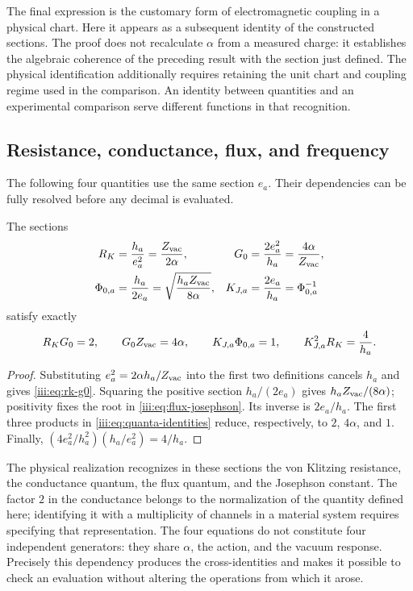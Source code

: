 The final expression is the customary form of electromagnetic coupling
in a physical chart. Here it appears as a subsequent identity of the
constructed sections. The proof does not recalculate $\alpha$ from a measured
charge: it establishes the algebraic coherence of the preceding result with the
section just defined. The physical identification additionally requires
retaining the unit chart and coupling regime used in the
comparison. An identity between quantities and an experimental comparison
serve different functions in that recognition.

\subsection{Resistance, conductance, flux, and frequency}

The following four quantities use the same section $e_a$. Their
dependencies can be fully resolved before any decimal is evaluated.

\begin{theorem}
The sections
\begin{align}
 R_K&=\frac{h_a}{e_a^2}=\frac{Z_{\rm vac}}{2\alpha},
 &G_0&=\frac{2e_a^2}{h_a}=\frac{4\alpha}{Z_{\rm vac}},
 \label{iii:eq:rk-g0}\\
 \Phi_{0,a}&=\frac{h_a}{2e_a}
 =\sqrt{\frac{h_aZ_{\rm vac}}{8\alpha}},
 &K_{J,a}&=\frac{2e_a}{h_a}=\Phi_{0,a}^{-1}
 \label{iii:eq:flux-josephson}
\end{align}
satisfy exactly
\begin{equation}
 R_KG_0=2,\qquad G_0Z_{\rm vac}=4\alpha,\qquad
 K_{J,a}\Phi_{0,a}=1,\qquad
 K_{J,a}^{2}R_K=\frac4{h_a}.
 \label{iii:eq:quanta-identities}
\end{equation}
\end{theorem}
\begin{proof}
Substituting $e_a^2=2\alpha h_a/Z_{\rm vac}$ into the first two
definitions cancels $h_a$ and gives \eqref{iii:eq:rk-g0}. Squaring
the positive section $h_a/(2e_a)$ gives
$h_aZ_{\rm vac}/(8\alpha)$; positivity fixes the root in
\eqref{iii:eq:flux-josephson}. Its inverse is $2e_a/h_a$.
The first three products in \eqref{iii:eq:quanta-identities}
reduce, respectively, to $2$, $4\alpha$, and $1$. Finally,
$(4e_a^2/h_a^2)(h_a/e_a^2)=4/h_a$.
\end{proof}

The physical realization recognizes in these sections the von
Klitzing resistance, the conductance quantum, the flux quantum, and the
Josephson constant. The factor $2$ in the conductance belongs to the normalization
of the quantity defined here; identifying it with a multiplicity of
channels in a material system requires specifying that representation.
The four equations do not constitute four independent generators:
they share $\alpha$, the action, and the vacuum response. Precisely this
dependency produces the cross-identities and makes it possible to check an
evaluation without altering the operations from which it arose.

